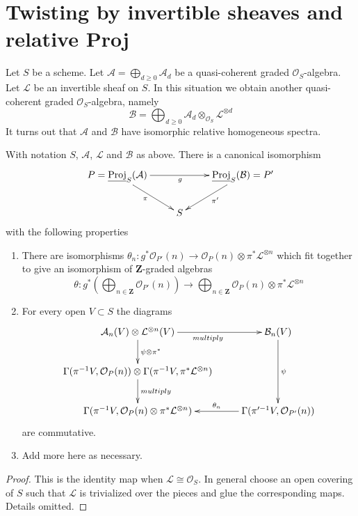 \section{Twisting by invertible sheaves and relative Proj}
\label{section-twisting-and-proj}

\noindent
Let $S$ be a scheme.
Let $\mathcal{A} = \bigoplus_{d \geq 0} \mathcal{A}_d$ be a
quasi-coherent graded $\mathcal{O}_S$-algebra.
Let $\mathcal{L}$ be an invertible sheaf on $S$.
In this situation we obtain another quasi-coherent graded
$\mathcal{O}_S$-algebra, namely
$$
\mathcal{B}
=
\bigoplus\nolimits_{d \geq 0}
\mathcal{A}_d \otimes_{\mathcal{O}_S} \mathcal{L}^{\otimes d}
$$
It turns out that $\mathcal{A}$ and $\mathcal{B}$ have
isomorphic relative homogeneous spectra.

\begin{lemma}
\label{lemma-twisting-and-proj}
With notation $S$, $\mathcal{A}$, $\mathcal{L}$ and $\mathcal{B}$ as
above. There is a canonical isomorphism
$$
\xymatrix{
P = \underline{\text{Proj}}_S(\mathcal{A})
\ar[rr]_g \ar[rd]_\pi & &
\underline{\text{Proj}}_S(\mathcal{B}) = P'
\ar[ld]^{\pi'} \\
& S &
}
$$
with the following properties
\begin{enumerate}
\item There are isomorphisms
$\theta_n : g^*\mathcal{O}_{P'}(n)
\to
\mathcal{O}_P(n) \otimes \pi^*\mathcal{L}^{\otimes n}$
which fit together to give an isomorphism of $\mathbf{Z}$-graded
algebras
$$
\theta :
g^*\left(
\bigoplus\nolimits_{n \in \mathbf{Z}} \mathcal{O}_{P'}(n)
\right)
\longrightarrow
\bigoplus\nolimits_{n \in \mathbf{Z}} \mathcal{O}_{P}(n)
\otimes \pi^*\mathcal{L}^{\otimes n}
$$
\item For every open $V \subset S$ the diagrams
$$
\xymatrix{
\mathcal{A}_n(V) \otimes \mathcal{L}^{\otimes n}(V)
\ar[r]_{multiply} \ar[d]^{\psi \otimes \pi^*}
&
\mathcal{B}_n(V) \ar[dd]^\psi \\
\Gamma(\pi^{-1}V, \mathcal{O}_P(n)) \otimes
\Gamma(\pi^{-1}V, \pi^*\mathcal{L}^{\otimes n})
\ar[d]^{multiply} \\
\Gamma(\pi^{-1}V, \mathcal{O}_P(n) \otimes \pi^*\mathcal{L}^{\otimes n})
&
\Gamma(\pi'^{-1}V, \mathcal{O}_{P'}(n)) \ar[l]_-{\theta_n}
}
$$
are commutative.
\item Add more here as necessary.
\end{enumerate}
\end{lemma}

\begin{proof}
This is the identity map when $\mathcal{L} \cong \mathcal{O}_S$.
In general choose an open covering of $S$ such that $\mathcal{L}$
is trivialized over the pieces and glue the corresponding maps.
Details omitted.
\end{proof}
















